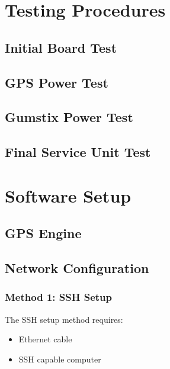 \section{Testing Procedures}

\subsection{Initial Board Test}
\label{app:suTest1}


\subsection{GPS Power Test}
\label{app:suTest2}


\subsection{Gumstix Power Test}
\label{app:suTest3}


\subsection{Final Service Unit Test}
\label{app:suTest4}


\section{Software Setup}

\subsection{GPS Engine}

\subsection{Network Configuration}

\subsubsection{Method 1: SSH Setup}
The SSH setup method requires:
\begin{itemize}
\item{Ethernet cable}
\item{SSH capable computer}
\end{itemize}

